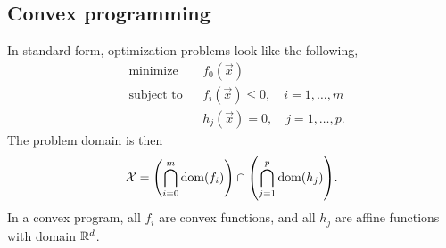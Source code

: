 %
%
%
%
%

\subsection{Convex programming}

In standard form, optimization problems look like the following, \[
    \begin{aligned}
         & \text{minimize}   &  & f_0(\vec{x})                                 \\
         & \text{subject to} &  & f_i(\vec{x}) \leq 0, \quad i = 1,\ldots,m    \\
         &                   &  & h_j(\vec{x}) = 0,    \quad j = 1, \ldots, p.
    \end{aligned}
\]
The problem domain is then \[
    \mathcal{X} = \lft( \bigcap_{i=0}^m \dom{f_i} \rgt) \cap \lft( \bigcap_{j=1}^p \dom{h_j} \rgt).
\]
In a convex program, all $f_i$ are convex functions, and all $h_j$ are affine functions with domain
$\mathbb{R}^d$.

